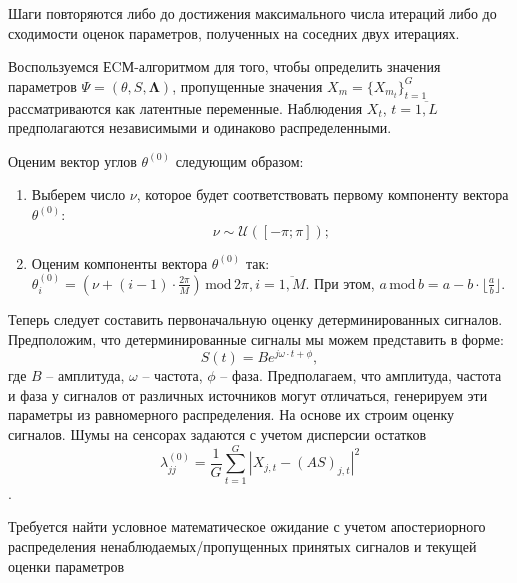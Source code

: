 \documentclass[11pt]{article}
\begin{document}
Шаги повторяются либо до достижения максимального числа итераций либо до сходимости оценок параметров, полученных на соседних двух итерациях.
\clearpage
\begin{center}
\fontsize{16}{20}\selectfont {}
\end{center}
Воспользуемся ЕCМ-алгоритмом для того, чтобы определить значения параметров $\Psi = (\theta, S, \mathbf{\Lambda})$, пропущенные значения $X_m=\{X_{m_t}\}_{t=1}^G$ рассматриваются как латентные переменные. Наблюдения $X_t$, $t=\overline{1,L}$ предполагаются независимыми и одинаково распределенными.
\begin{center}
\fontsize{14}{18}\selectfont {}
\end{center}
Оценим вектор углов $\theta^{(0)}$ следующим образом:
\begin{enumerate}
\item
Выберем число $\nu$, которое будет соответствовать первому компоненту вектора $\theta^{(0)}$:
\begin{equation}
\nu \sim \mathcal{U}([-\pi;\pi]);
\end{equation}
\item
Оценим компоненты вектора $\theta^{(0)}$ так:  $\theta^{(0)}_i = (\nu + (i-1)\cdot \frac{2\pi}{M})\, \text{mod} \, 2\pi, i = \overline{1,M}$. При этом,  $a \, \text{mod} \, b = a - b \cdot \lfloor \frac{a}{b} \rfloor$.
\end{enumerate}
Теперь следует составить первоначальную оценку детерминированных сигналов. Предположим, что детерминированные сигналы мы можем представить в форме:
\begin{equation}
S(t) = Be^{j\omega \cdot t + \phi},
\end{equation}
где $B$ -- амплитуда, $\omega$ -- частота, $\phi$ -- фаза.
Предполагаем, что амплитуда, частота и фаза у сигналов от различных источников могут отличаться, генерируем эти параметры из равномерного распределения. На основе их строим оценку сигналов.
Шумы на сенсорах задаются  с учетом дисперсии остатков
\begin{equation}
\lambda^{(0)}_{jj} = \frac{1}{G} \sum_{t=1}^G |X_{j,t} - (AS)_{j,t}|^2
\end{equation}.
\begin{center}
\fontsize{14}{18}\selectfont {}
\end{center}
Требуется найти условное математическое ожидание с учетом апостериорного распределения ненаблюдаемых/пропущенных принятых сигналов и текущей оценки параметров
\end{document}
